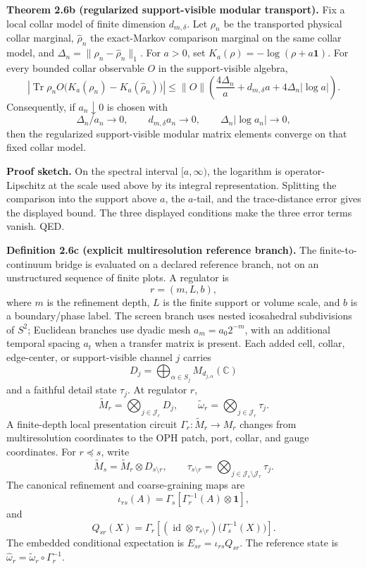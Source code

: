 \textbf{Theorem 2.6b (regularized support-visible modular transport).} Fix a local collar model of finite dimension \(d_{m,\delta}\). Let \(\rho_n\) be the transported physical collar marginal, \(\widehat\rho_n\) the exact-Markov comparison marginal on the same collar model, and \(\Delta_n=\|\rho_n-\widehat\rho_n\|_1\). For \(a>0\), set \(K_a(\rho)=-\log(\rho+a\mathbf 1)\). For every bounded collar observable \(O\) in the support-visible algebra,
\[
\left|\operatorname{Tr}\rho_n O\bigl(K_a(\rho_n)-K_a(\widehat\rho_n)\bigr)\right|
\le
\|O\|\left(
  \frac{4\Delta_n}{a}
  + d_{m,\delta}a
  +4\Delta_n|\log a|
\right).
\]
Consequently, if \(a_n\downarrow0\) is chosen with
\[
\Delta_n/a_n\to0,\qquad
d_{m,\delta}a_n\to0,\qquad
\Delta_n|\log a_n|\to0,
\]
then the regularized support-visible modular matrix elements converge on that fixed collar model.

\textbf{Proof sketch.} On the spectral interval \([a,\infty)\), the logarithm is operator-Lipschitz at the scale used above by its integral representation. Splitting the comparison into the support above \(a\), the \(a\)-tail, and the trace-distance error gives the displayed bound. The three displayed conditions make the three error terms vanish. QED.

\textbf{Definition 2.6c (explicit multiresolution reference branch).}\label{def:explicit-multiresolution-reference-branch}
The finite-to-continuum bridge is evaluated on a declared reference branch, not on an
unstructured sequence of finite plots. A regulator is
\[
r=(m,L,b),
\]
where \(m\) is the refinement depth, \(L\) is the finite support or volume scale, and \(b\)
is a boundary/phase label. The screen branch uses nested icosahedral subdivisions of \(S^2\);
Euclidean branches use dyadic mesh \(a_m=a_0 2^{-m}\), with an additional temporal spacing
\(a_t\) when a transfer matrix is present. Each added cell, collar, edge-center, or
support-visible channel \(j\) carries
\[
D_j=\bigoplus_{\alpha\in S_j}M_{d_{j,\alpha}}(\mathbb C)
\]
and a faithful detail state \(\tau_j\). At regulator \(r\),
\[
\widetilde M_r=\bigotimes_{j\in\mathcal J_r}D_j,\qquad
\widetilde\omega_r=\bigotimes_{j\in\mathcal J_r}\tau_j .
\]
A finite-depth local presentation circuit \(\Gamma_r:\widetilde M_r\to M_r\) changes from
multiresolution coordinates to the OPH patch, port, collar, and gauge coordinates. For
\(r\preceq s\), write
\[
\widetilde M_s=\widetilde M_r\otimes D_{s\setminus r},\qquad
\tau_{s\setminus r}=\bigotimes_{j\in\mathcal J_s\setminus\mathcal J_r}\tau_j .
\]
The canonical refinement and coarse-graining maps are
\[
\iota_{rs}(A)=
\Gamma_s\!\left[\Gamma_r^{-1}(A)\otimes\mathbf1\right],
\]
and
\[
Q_{sr}(X)=
\Gamma_r\!\left[
(\operatorname{id}\otimes\tau_{s\setminus r})
\bigl(\Gamma_s^{-1}(X)\bigr)
\right].
\]
The embedded conditional expectation is \(E_{sr}=\iota_{rs}Q_{sr}\). The reference state is
\(\widehat\omega_r=\widetilde\omega_r\circ\Gamma_r^{-1}\).

